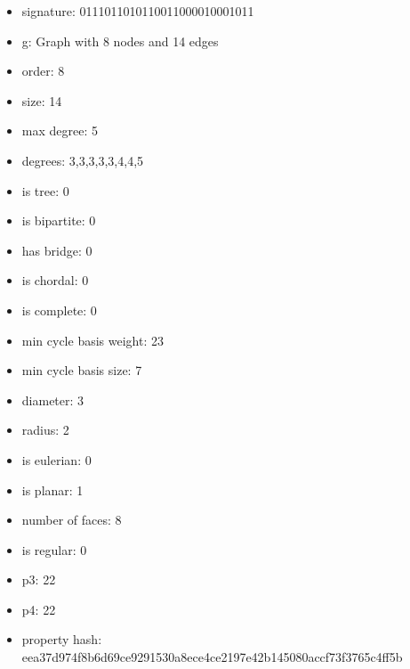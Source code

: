 \begin{itemize}
\item signature: 0111011010110011000010001011
\item g: Graph with 8 nodes and 14 edges
\item order: 8
\item size: 14
\item max degree: 5
\item degrees: 3,3,3,3,3,4,4,5
\item is tree: 0
\item is bipartite: 0
\item has bridge: 0
\item is chordal: 0
\item is complete: 0
\item min cycle basis weight: 23
\item min cycle basis size: 7
\item diameter: 3
\item radius: 2
\item is eulerian: 0
\item is planar: 1
\item number of faces: 8
\item is regular: 0
\item p3: 22
\item p4: 22
\item property hash: eea37d974f8b6d69ce9291530a8ece4ce2197e42b145080accf73f3765c4ff5b
\end{itemize}
\newpage
\begin{figure}
\end{figure}
